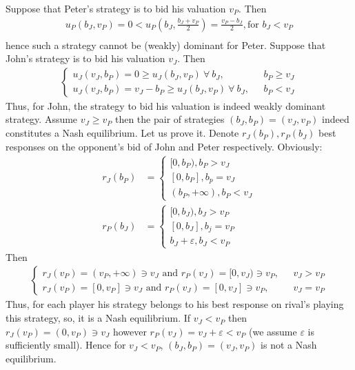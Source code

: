 \documentclass[a4paper]{article}
\begin{document}
Suppose that Peter's strategy is to bid his valuation $v_P$. Then
\begin{align*}
u_P(b_J, v_P) = 0 < u_P\left(b_J, \frac{b_J + v_P}{2}\right) = \frac{v_P - b_J}{2}, \text{for }b_J < v_P\\
\end{align*}
hence such a strategy cannot be (weakly) dominant for Peter.
Suppose that John's strategy is to bid his valuation $v_J$. Then
\begin{align*}
\begin{cases}
u_J(v_J, b_P) = 0 \ge u_J(b_J, v_P)\ \forall\ b_J , \ \ \ &b_P \ge v_{J}\\
u_J(v_J, b_P) = v_J - b_P \ge u_J(b_J, v_P)\ \forall\ b_J, \ \ \ &b_P < v_J
\end{cases}
\end{align*}
Thus, for John, the strategy to bid his valuation is indeed weakly dominant strategy.
Assume $v_J \ge v_P$ then the pair of strategies $(b_J, b_P) = (v_J, v_P)$ indeed constitutes a Nash equilibrium. Let us prove it. Denote $r_J(b_P), r_P(b_J)$ best responses on the opponent's bid of John and Peter respectively. Obviously:
\begin{align*}
r_J(b_P) &= \begin{cases}
[0, b_P), b_P > v_J\\
[0, b_P], b_p = v_J\\
(b_P, +\infty), b_P < v_J
\end{cases}\\
r_P(b_J) &= \begin{cases}
[0, b_J), b_J > v_P\\
[0, b_J], b_j = v_P\\
b_J + \varepsilon, b_J < v_P
\end{cases}
\end{align*}
Then 
\begin{align*}
\begin{cases}
r_J(v_P) = (v_P, +\infty) \ni v_J \text{ and } r_P(v_J) = [0, v_J) \ni v_P, \ \ \ &v_J > v_P\\
r_J(v_P) = [0, v_P] \ni v_J \text{ and } r_P(v_J) = [0, v_J] \ni v_P, \ \ \ &v_J = v_P
\end{cases}
\end{align*} 
Thus, for each player his strategy belongs to his best response on rival's playing this strategy, so, it is a Nash equilibrium.
If $v_J < v_P$ then $r_J(v_P) = (0, v_P) \ni v_J$ however $r_P(v_J) = v_J + \varepsilon < v_P$ (we assume $\varepsilon$ is sufficiently small). Hence for $v_J < v_P$, $(b_J, b_P) = (v_J, v_P)$ is not a Nash equilibrium.
\end{document}
